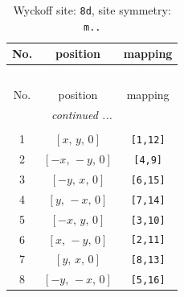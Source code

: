 \documentclass[fleqn,8pt]{jsarticle}
\begin{document}
\renewcommand{\arraystretch}{1.2}
\begin{longtable}{ccc}
\caption{Wyckoff site: {\tt 8d}, site symmetry: {\tt m..}}
 \\
 \hline \hline
No. & position & mapping \\ \hline \endfirsthead

\multicolumn{2}{l}{\tablename\ \thetable{}} \\
 \hline \hline
No. & position & mapping \\ \hline \endhead

 \hline \hline
\multicolumn{2}{r}{\footnotesize\it continued ...} \\ \endfoot

 \hline \hline
\multicolumn{2}{r}{} \\ \endlastfoot

1 & $\left[ x,\, y,\, 0 \right]$ & {\tt [1,12]} \\ \hline
2 & $\left[ - x,\, - y,\, 0 \right]$ & {\tt [4,9]} \\ \hline
3 & $\left[ - y,\, x,\, 0 \right]$ & {\tt [6,15]} \\ \hline
4 & $\left[ y,\, - x,\, 0 \right]$ & {\tt [7,14]} \\ \hline
5 & $\left[ - x,\, y,\, 0 \right]$ & {\tt [3,10]} \\ \hline
6 & $\left[ x,\, - y,\, 0 \right]$ & {\tt [2,11]} \\ \hline
7 & $\left[ y,\, x,\, 0 \right]$ & {\tt [8,13]} \\ \hline
8 & $\left[ - y,\, - x,\, 0 \right]$ & {\tt [5,16]} \\
\end{longtable}
\renewcommand{\arraystretch}{1.2}
\end{document}
